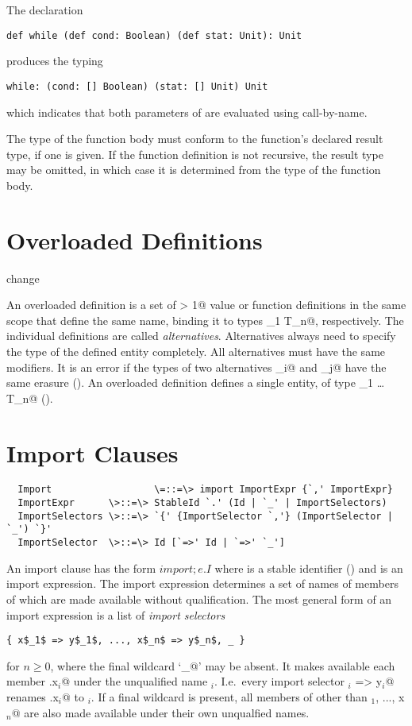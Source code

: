 \documentclass[11pt]{report}
\renewcommand{\todo}[1]{#1}
\begin{document}
\example The declaration
\begin{verbatim}
def while (def cond: Boolean) (def stat: Unit): Unit
\end{verbatim}
produces the typing
\begin{verbatim}
while: (cond: [] Boolean) (stat: [] Unit) Unit
\end{verbatim}
which indicates that both parameters of \verb@while@ are evaluated using
call-by-name.

The type of the function body must conform to the function's declared
result type, if one is given. If the function definition is not
recursive, the result type may be omitted, in which case it is
determined from the type of the function body.


\section{Overloaded Definitions}
\label{sec:overloaded-defs}
\todo{change}

An overloaded definition is a set of \verb@n > 1@ value or function
definitions in the same scope that define the same name, binding it to
types \verb@T_1 \commadots T_n@, respectively.  The individual
definitions are called {\em alternatives}.  Alternatives always need
to specify the type of the defined entity completely.  All
alternatives must have the same modifiers. It is an error if the types
of two alternatives \verb@T_i@ and \verb@T_j@ have the same erasure
().  An overloaded definition defines a single
entity, of type \verb@T_1 \overload \ldots \overload T_n@
().

\section{Import Clauses}
\label{sec:import}

\syntax\begin{verbatim}
  Import                  \=::=\> import ImportExpr {`,' ImportExpr}
  ImportExpr      \>::=\> StableId `.' (Id | `_' | ImportSelectors)
  ImportSelectors \>::=\> `{' {ImportSelector `,'} (ImportSelector | `_') `}'
  ImportSelector  \>::=\> Id [`=>' Id | `=>' `_']
\end{verbatim}

An import clause has the form $import;e.I$ where \verb@e@ is a stable
identifier () and \verb@I@ is an import expression.
The import expression determines a set of names of members of \verb@e@
which are made available without qualification. The most general form
of an import expression is a list of {\em import selectors}
\begin{verbatim}
{ x$_1$ => y$_1$, ..., x$_n$ => y$_n$, _ }
\end{verbatim}
for $n \geq 0$, where the final wildcard `\verb@_@' may be absent.  It
makes available each member \verb@e.x$_i$@ under the unqualified name
\verb@y$_i$. I.e.\ every import selector \verb@x$_i$ => y$_i$@ renames
\verb@e.x$_i$@ to
\verb@y$_i$.  If a final wildcard is present, all members \verb@z@ of
\verb@e@ other than \verb@x$_1$, ..., x$_n$@ are also made available
under their own unqualfied names.
\end{document}
